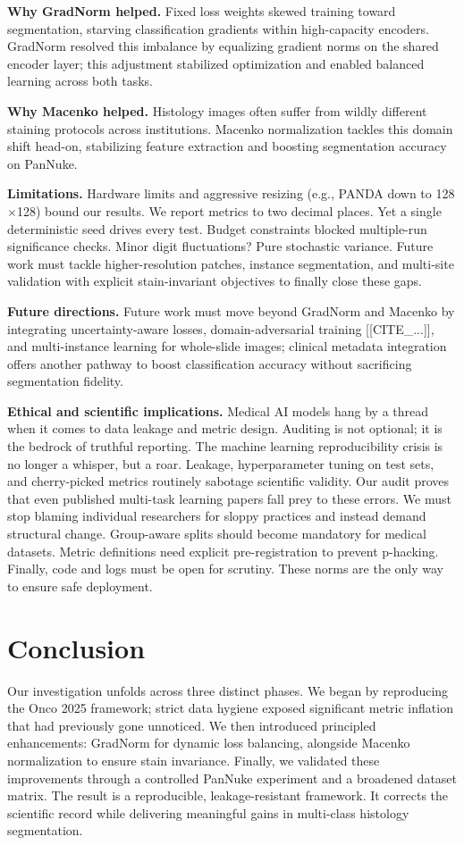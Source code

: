 \documentclass[conference,a4paper]{IEEEtran}
\begin{document}
\textbf{Why GradNorm helped.} Fixed loss weights skewed training toward segmentation, starving classification gradients within high-capacity encoders. GradNorm resolved this imbalance by equalizing gradient norms on the shared encoder layer; this adjustment stabilized optimization and enabled balanced learning across both tasks.

\textbf{Why Macenko helped.} Histology images often suffer from wildly different staining protocols across institutions. Macenko normalization tackles this domain shift head-on, stabilizing feature extraction and boosting segmentation accuracy on PanNuke.

\textbf{Limitations.} Hardware limits and aggressive resizing (e.g., PANDA down to 128$\times$128) bound our results. We report metrics to two decimal places. Yet a single deterministic seed drives every test. Budget constraints blocked multiple-run significance checks. Minor digit fluctuations? Pure stochastic variance. Future work must tackle higher-resolution patches, instance segmentation, and multi-site validation with explicit stain-invariant objectives to finally close these gaps.

\textbf{Future directions.} Future work must move beyond GradNorm and Macenko by integrating uncertainty-aware losses, domain-adversarial training [[CITE_...]], and multi-instance learning for whole-slide images; clinical metadata integration offers another pathway to boost classification accuracy without sacrificing segmentation fidelity.

\textbf{Ethical and scientific implications.} Medical AI models hang by a thread when it comes to data leakage and metric design. Auditing is not optional; it is the bedrock of truthful reporting. The machine learning reproducibility crisis is no longer a whisper, but a roar. Leakage, hyperparameter tuning on test sets, and cherry-picked metrics routinely sabotage scientific validity. Our audit proves that even published multi-task learning papers fall prey to these errors. We must stop blaming individual researchers for sloppy practices and instead demand structural change. Group-aware splits should become mandatory for medical datasets. Metric definitions need explicit pre-registration to prevent p-hacking. Finally, code and logs must be open for scrutiny. These norms are the only way to ensure safe deployment.

\section{Conclusion}
Our investigation unfolds across three distinct phases. We began by reproducing the Onco 2025 framework; strict data hygiene exposed significant metric inflation that had previously gone unnoticed. We then introduced principled enhancements: GradNorm for dynamic loss balancing, alongside Macenko normalization to ensure stain invariance. Finally, we validated these improvements through a controlled PanNuke experiment and a broadened dataset matrix. The result is a reproducible, leakage-resistant framework. It corrects the scientific record while delivering meaningful gains in multi-class histology segmentation.
\end{document}
